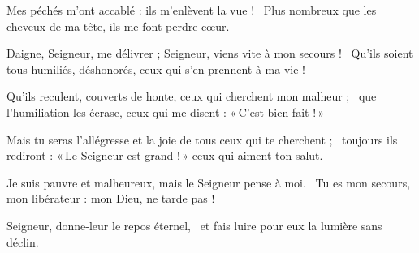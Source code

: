 \item Mes péchés m'ont accablé : ils m'enlèvent la vue !~\psstar{} Plus nombreux que les cheveux de ma tête, ils me font perdre cœur.

\item Daigne, Seigneur, me délivrer ; Seigneur, viens vite à mon secours !~\psstar{} Qu'ils soient tous humiliés, déshonorés, ceux qui s'en prennent à ma vie !

\item Qu'ils reculent, couverts de honte, ceux qui cherchent mon malheur ;~\psstar{} que l'humiliation les écrase, ceux qui me disent : «\,C'est bien fait !\,»

\item Mais tu seras l'allégresse et la joie de tous ceux qui te cherchent ;~\psstar{} toujours ils rediront : «\,Le Seigneur est grand !\,» ceux qui aiment ton salut.

\item Je suis pauvre et malheureux, mais le Seigneur pense à moi.~\psstar{} Tu es mon secours, mon libérateur : mon Dieu, ne tarde pas !

\item Seigneur, donne-leur le repos éternel,~\psstar{} et fais luire pour eux la lumière sans déclin.